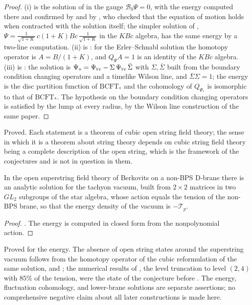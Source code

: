 \begin{proof}
(i) is the solution of \cite{Schnabl05} in the gauge $\mathcal B_0\Psi = 0$, with the energy computed there and confirmed by \cite{Okawa06} and by \cite{FuchsKroyter06}, who checked that the equation of motion holds when contracted with the solution itself; the simpler solution of \cite{ErlerSchnabl09}, $\Psi = \frac{1}{\sqrt{1+K}}\,c(1+K)Bc\,\frac{1}{\sqrt{1+K}}$ in the $KBc$ algebra, has the same energy by a two-line computation. (ii) is \cite{EllwoodSchnabl07}: for the Erler--Schnabl solution the homotopy operator is $A = B/(1+K)$, and $Q_\Psi A = 1$ is an identity of the $KBc$ algebra. (iii) is \cite[Section~4]{ErlerMaccaferri14}: the solution is $\Psi_* = \Psi_{\rm tv} - \Sigma\,\Psi_{\rm tv}\,\bar\Sigma$ with $\Sigma,\bar\Sigma$ built from the boundary condition changing operators and a timelike Wilson line, and $\bar\Sigma\Sigma = 1$; the energy is the disc partition function of $\mathrm{BCFT}_*$ and the cohomology of $Q_{\Psi_*}$ is isomorphic to that of $\mathrm{BCFT}_*$. The hypothesis on the boundary condition changing operators is satisfied by the lump at every radius, by the Wilson line construction of the same paper.
\end{proof}

\begin{verdict}[claims 12, 13, 14]
Proved. Each statement is a theorem of cubic open string field theory; the sense in which it is a theorem about string theory depends on cubic string field theory being a complete description of the open string, which is the framework of the conjectures and is not in question in them.
\end{verdict}

\begin{theorem}\label{thm:superstring}
In the open superstring field theory of Berkovits on a non-BPS D-brane there is an analytic solution for the tachyon vacuum, built from $2\times 2$ matrices in two $GL_2$ subgroups of the star algebra, whose action equals the tension of the non-BPS brane, so that the energy density of the vacuum is $-\mathcal T_p$.
\end{theorem}

\begin{proof}
\cite{Erler13}. The energy is computed in closed form from the nonpolynomial action.
\end{proof}

\begin{verdict}[claim 15]
Proved for the energy. The absence of open string states around the superstring vacuum follows from the homotopy operator of the cubic reformulation of the same solution, and ; the numerical results of \cite{BSZ00}, the level truncation to level $(2,4)$ with $85\%$ of the tension, were the state of the conjecture before \cite{Erler13}.
 The energy, fluctuation cohomology, and lower-brane solutions are separate assertions; no comprehensive negative claim about all later constructions is made here.
\end{verdict}
